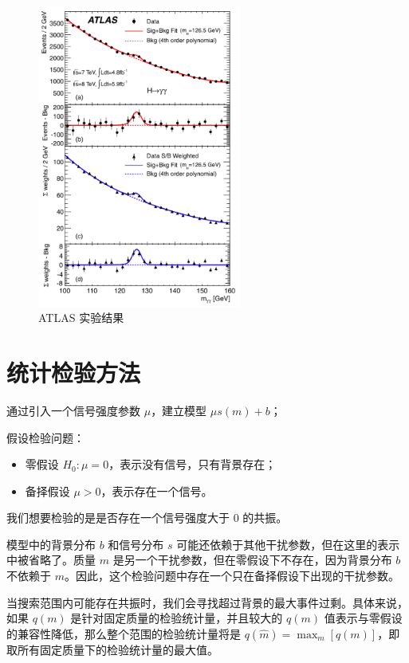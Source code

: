 \begin{figure}[htbp]
    \centering
    \includegraphics[width=0.6\textwidth]{pic/atlas.png}
    \caption{ATLAS 实验结果}
    \label{fig:ATLAS}
\end{figure}

\section{统计检验方法}

通过引入一个信号强度参数 $\mu$，建立模型 $\mu s(m) + b$；

假设检验问题：

\begin{itemize}
    \item 零假设 $H_0: \mu=0$，表示没有信号，只有背景存在；
    \item 备择假设 $\mu > 0$，表示存在一个信号。
\end{itemize}

我们想要检验的是是否存在一个信号强度大于 $0$ 的共振。

模型中的背景分布 $b$ 和信号分布 $s$ 可能还依赖于其他干扰参数，但在这里的表示中被省略了。质量 $m$ 是另一个干扰参数，但在零假设下不存在，因为背景分布 $b$ 不依赖于 $m$。因此，这个检验问题中存在一个只在备择假设下出现的干扰参数。

当搜索范围内可能存在共振时，我们会寻找超过背景的最大事件过剩。具体来说，如果 $q(m)$ 是针对固定质量的检验统计量，并且较大的 $q(m)$ 值表示与零假设的兼容性降低，那么整个范围的检验统计量将是 $q(\hat{m})=\max_m ⁡[q(m)]$，即取所有固定质量下的检验统计量的最大值。

